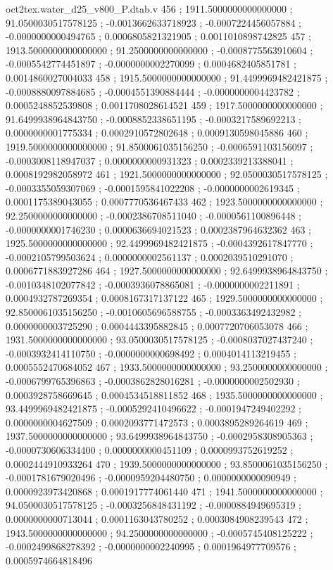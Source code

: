 \begin{filecontents}[overwrite]{oct2tex.water_d25_v800_P.dtab.v}
456 ; 1911.5000000000000000 ; 91.0500030517578125 ; -0.0013662633718923 ; -0.0007224456057884 ; -0.0000000000494765 ; 0.0006805821321905 ; 0.0011010898742825
457 ; 1913.5000000000000000 ; 91.2500000000000000 ; -0.0008775563910604 ; -0.0005542774451897 ; -0.0000000002270099 ; 0.0004682405851781 ; 0.0014860027004033
458 ; 1915.5000000000000000 ; 91.4499969482421875 ; -0.0008880097884685 ; -0.0004551390884444 ; -0.0000000004423782 ; 0.0005248852539808 ; 0.0011708028614521
459 ; 1917.5000000000000000 ; 91.6499938964843750 ; -0.0008852338651195 ; -0.0003217589692213 ; 0.0000000001775334 ; 0.0002910572802648 ; 0.0009130598045886
460 ; 1919.5000000000000000 ; 91.8500061035156250 ; -0.0006591103156097 ; -0.0003008118947037 ; 0.0000000000931323 ; 0.0002339213388041 ; 0.0008192982058972
461 ; 1921.5000000000000000 ; 92.0500030517578125 ; -0.0003355059307069 ; -0.0001595841022208 ; -0.0000000002619345 ; 0.0001175389043055 ; 0.0007770536467433
462 ; 1923.5000000000000000 ; 92.2500000000000000 ; -0.0002386708511040 ; -0.0000561100896448 ; -0.0000000001746230 ; 0.0000636694021523 ; 0.0002387964632362
463 ; 1925.5000000000000000 ; 92.4499969482421875 ; -0.0004392617847770 ; -0.0002105799503624 ; 0.0000000002561137 ; 0.0002039510291070 ; 0.0006771883927286
464 ; 1927.5000000000000000 ; 92.6499938964843750 ; -0.0010348102077842 ; -0.0003936078865081 ; -0.0000000002211891 ; 0.0004932787269354 ; 0.0008167317137122
465 ; 1929.5000000000000000 ; 92.8500061035156250 ; -0.0010605696588755 ; -0.0003363492432982 ; 0.0000000003725290 ; 0.0004443395882845 ; 0.0007720706053078
466 ; 1931.5000000000000000 ; 93.0500030517578125 ; -0.0008037027437240 ; -0.0003932414110750 ; -0.0000000000698492 ; 0.0004014113219455 ; 0.0005552470684052
467 ; 1933.5000000000000000 ; 93.2500000000000000 ; -0.0006799765396863 ; -0.0003862828016281 ; -0.0000000002502930 ; 0.0003928758669645 ; 0.0004534518811852
468 ; 1935.5000000000000000 ; 93.4499969482421875 ; -0.0005292410496622 ; -0.0001947249402292 ; 0.0000000004627509 ; 0.0002093771472573 ; 0.0003895289264619
469 ; 1937.5000000000000000 ; 93.6499938964843750 ; -0.0002958308905363 ; -0.0000730606334400 ; 0.0000000000451109 ; 0.0000993752619252 ; 0.0002444910933264
470 ; 1939.5000000000000000 ; 93.8500061035156250 ; -0.0001781679020496 ; -0.0000959204480750 ; 0.0000000000090949 ; 0.0000923973420868 ; 0.0001917774061440
471 ; 1941.5000000000000000 ; 94.0500030517578125 ; -0.0003256848431192 ; -0.0000884949695319 ; 0.0000000000713044 ; 0.0001163043780252 ; 0.0003084908239543
472 ; 1943.5000000000000000 ; 94.2500000000000000 ; -0.0005745408125222 ; -0.0002499868278392 ; -0.0000000002240995 ; 0.0001964977709576 ; 0.0005974664818496

\end{filecontents}
